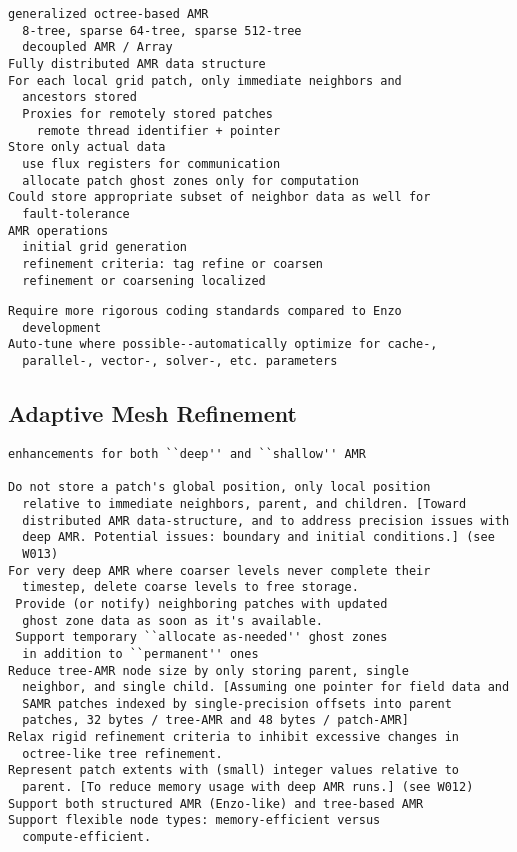 \documentclass[14pt,letter]{article}
\begin{document}
\begin{verbatim}
generalized octree-based AMR 
  8-tree, sparse 64-tree, sparse 512-tree
  decoupled AMR / Array
Fully distributed AMR data structure
For each local grid patch, only immediate neighbors and
  ancestors stored
  Proxies for remotely stored patches
    remote thread identifier + pointer
Store only actual data
  use flux registers for communication
  allocate patch ghost zones only for computation
Could store appropriate subset of neighbor data as well for
  fault-tolerance
AMR operations
  initial grid generation
  refinement criteria: tag refine or coarsen
  refinement or coarsening localized
\end{verbatim}



\begin{verbatim}
Require more rigorous coding standards compared to Enzo
  development
Auto-tune where possible--automatically optimize for cache-,
  parallel-, vector-, solver-, etc. parameters
\end{verbatim}

\subsection{Adaptive Mesh Refinement} \label{ss:amr}

\begin{verbatim}
enhancements for both ``deep'' and ``shallow'' AMR

Do not store a patch's global position, only local position
  relative to immediate neighbors, parent, and children. [Toward
  distributed AMR data-structure, and to address precision issues with
  deep AMR. Potential issues: boundary and initial conditions.] (see
  W013)
For very deep AMR where coarser levels never complete their
  timestep, delete coarse levels to free storage.
 Provide (or notify) neighboring patches with updated
  ghost zone data as soon as it's available.
 Support temporary ``allocate as-needed'' ghost zones
  in addition to ``permanent'' ones
Reduce tree-AMR node size by only storing parent, single
  neighbor, and single child. [Assuming one pointer for field data and
  SAMR patches indexed by single-precision offsets into parent
  patches, 32 bytes / tree-AMR and 48 bytes / patch-AMR]
Relax rigid refinement criteria to inhibit excessive changes in
  octree-like tree refinement.
Represent patch extents with (small) integer values relative to
  parent. [To reduce memory usage with deep AMR runs.] (see W012)
Support both structured AMR (Enzo-like) and tree-based AMR
Support flexible node types: memory-efficient versus
  compute-efficient.
\end{verbatim}
\end{document}
